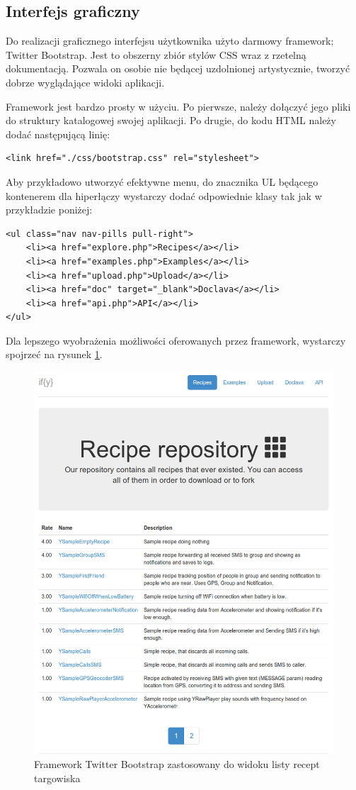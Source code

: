 \documentclass[11pt,a4paper,polish,thesis]{dcsbook}
\begin{document}
\subsection{Interfejs graficzny}
Do realizacji graficznego interfejsu użytkownika użyto darmowy framework; Twitter Bootstrap. Jest to obszerny zbiór stylów CSS wraz z rzetelną dokumentacją. Pozwala on
osobie nie będącej uzdolnionej artystycznie, tworzyć dobrze wyglądające widoki aplikacji.

Framework jest bardzo prosty w użyciu. Po pierwsze, należy dołączyć jego pliki do struktury katalogowej swojej aplikacji. Po drugie, do kodu HTML należy dodać
następującą linię:
\begin{verbatim}
<link href="./css/bootstrap.css" rel="stylesheet">
\end{verbatim}

Aby przykładowo utworzyć efektywne menu, do znacznika UL będącego kontenerem dla hiperłączy wystarczy dodać odpowiednie klasy tak jak w przykładzie poniżej:
\begin{verbatim}
<ul class="nav nav-pills pull-right">
	<li><a href="explore.php">Recipes</a></li>
	<li><a href="examples.php">Examples</a></li>
	<li><a href="upload.php">Upload</a></li>
	<li><a href="doc" target="_blank">Doclava</a></li>
	<li><a href="api.php">API</a></li>
</ul>
\end{verbatim}

Dla lepszego wyobrażenia możliwości oferowanych przez framework, wystarczy spojrzeć na rysunek \ref{fig:market}. %
\begin{figure}[p]
  \centering
  \includegraphics[scale=0.55]{./resources/market.png}
  \caption{Framework Twitter Bootstrap zastosowany do widoku listy recept targowiska}
  \label{fig:market}
\end{figure}
\end{document}

